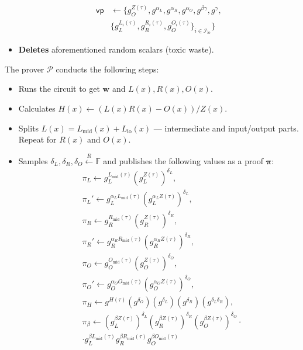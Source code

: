 \documentclass[../lecture-notes.tex]{subfiles}
\begin{document}
\begin{tcolorbox}
\begin{itemize}[label=, left=0mm]
\begin{equation*}
            \begin{aligned}    
                \mathsf{vp} &\gets \big\{ g_O^{Z(\tau)}, g^{\alpha_L}, g^{\alpha_R}, g^{\alpha_O}, g^{\beta\gamma}, g^{\gamma}, \\
                            & \{g_L^{L_i(\tau)}, g_R^{R_i(\tau)}, g_O^{O_i(\tau)}\}_{i \in \mathcal{I}_{\text{io}}} \big\}
            \end{aligned}
        \end{equation*}
        \item \textbf{Deletes} aforementioned random scalars (toxic waste).
    \end{itemize}
    The prover $\mathcal{P}$ conducts the following steps:
    \begin{itemize}[label=, left=0mm]
        \item Runs the circuit to get $\mathbf{w}$ and $L(x),R(x),O(x)$.
        \item Calculates $H(x) \gets (L(x)R(x) - O(x))\big/ Z(x)$.
        \item Splits $L(x) = L_{\text{mid}}(x) + L_{\text{io}}(x)$ --- intermediate and input/output parts. Repeat for $R(x)$ and $O(x)$.
        \item Samples $\delta_L, \delta_R, \delta_O \xleftarrow{R} \mathbb{F}$ and publishes the following values as a proof $\boldsymbol{\pi}$: 
        \begin{equation*}
            \begin{aligned} 
                &\pi_L \gets g_L^{L_{\text{mid}}(\tau)}\left(g_L^{Z(\tau)}\right)^{\delta_L}, \\ & \pi_L' \gets g_L^{\alpha_LL_{\text{mid}}(\tau)}\left(g_L^{\alpha_L Z(\tau)}\right)^{\delta_L}, \\
                &\pi_R \gets g_R^{R_{\text{mid}}(\tau)}\left(g_R^{Z(\tau)}\right)^{\delta_R}, \\ & \pi_R' \gets g_R^{\alpha_RR_{\text{mid}}(\tau)}\left(g_R^{\alpha_R Z(\tau)}\right)^{\delta_R}, \\
                &\pi_O \gets g_O^{O_{\text{mid}}(\tau)}\left(g_O^{Z(\tau)}\right)^{\delta_O}, \\ & \pi_O' \gets g_O^{\alpha_OO_{\text{mid}}(\tau)}\left(g_O^{\alpha_O Z(\tau)}\right)^{\delta_O}, \\
                &\pi_H \gets g^{H(\tau)}(g^{\delta_O})(g^{\delta_L})(g^{\delta_R})(g^{\delta_L\delta_R}), \\ 
                &\pi_{\beta} \gets \left(g_L^{\beta Z(\tau)}\right)^{\delta_L}\left(g_R^{\beta Z(\tau)}\right)^{\delta_R}\left(g_O^{\beta Z(\tau)}\right)^{\delta_O} \cdot \\ & \cdot g_L^{\beta L_{\text{mid}}(\tau)}g_R^{\beta R_{\text{mid}}(\tau)}g_O^{\beta O_{\text{mid}}(\tau)}

\end{aligned}
\end{equation*}
\end{itemize}
\end{tcolorbox}
\end{document}

